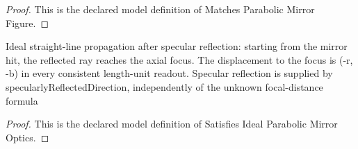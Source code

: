 \begin{proof}
  This is the declared model definition of Matches Parabolic Mirror Figure.
\end{proof}
\begin{definition}
  \label{def:physics:phyx-mini-0114:phyxminiproblems-problemphyxmini0114-satisfiesidealparabolicmirroroptics}
  Ideal straight-line propagation after specular reflection: starting from the mirror hit, the reflected ray reaches the axial focus. The displacement to the focus is (-r, -b) in every consistent length-unit readout. Specular reflection is supplied by specularlyReflectedDirection, independently of the unknown focal-distance formula
\end{definition}
\begin{proof}
  This is the declared model definition of Satisfies Ideal Parabolic Mirror Optics.
\end{proof}
